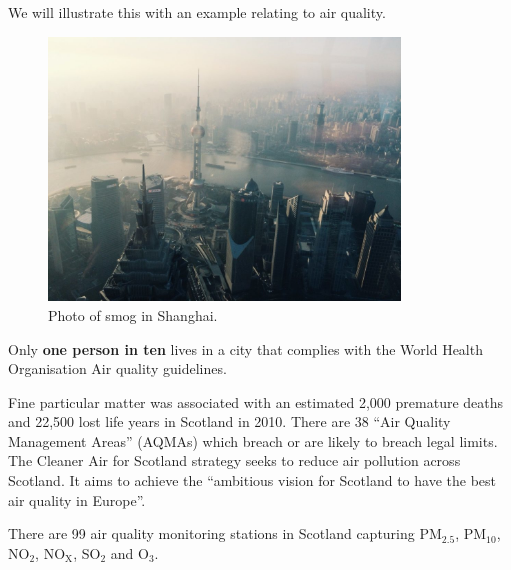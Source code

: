 \documentclass[
  letterpaper,
  DIV=11,
  numbers=noendperiod]{scrartcl}
\begin{document}
\begin{tcolorbox}[enhanced jigsaw, breakable, bottomrule=.15mm, toprule=.15mm, colbacktitle=quarto-callout-important-color!10!white, bottomtitle=1mm, arc=.35mm, opacitybacktitle=0.6, titlerule=0mm, colframe=quarto-callout-important-color-frame, toptitle=1mm, title={Example: Air quality}, rightrule=.15mm, leftrule=.75mm, left=2mm, colback=white, opacityback=0, coltitle=black]

We will illustrate this with an example relating to air quality.

\begin{figure}[H]

{\centering \includegraphics[width=3.67708in,height=\textheight]{images/Shanghai.jpg}

}

\caption{Photo of smog in Shanghai.}

\end{figure}%

Only \textbf{one person in ten} lives in a city that complies with the
World Health Organisation Air quality guidelines.

Fine particular matter was associated with an estimated 2,000 premature
deaths and 22,500 lost life years in Scotland in 2010. There are 38
``Air Quality Management Areas'' (AQMAs) which breach or are likely to
breach legal limits. The Cleaner Air for Scotland strategy seeks to
reduce air pollution across Scotland. It aims to achieve the ``ambitious
vision for Scotland to have the best air quality in Europe''.

There are 99 air quality monitoring stations in Scotland capturing
PM\(_{2.5}\), PM\(_{10}\), NO\(_2\), NO\(_\text{X}\), SO\(_2\) and
O\(_3\).


\end{tcolorbox}
\end{document}
